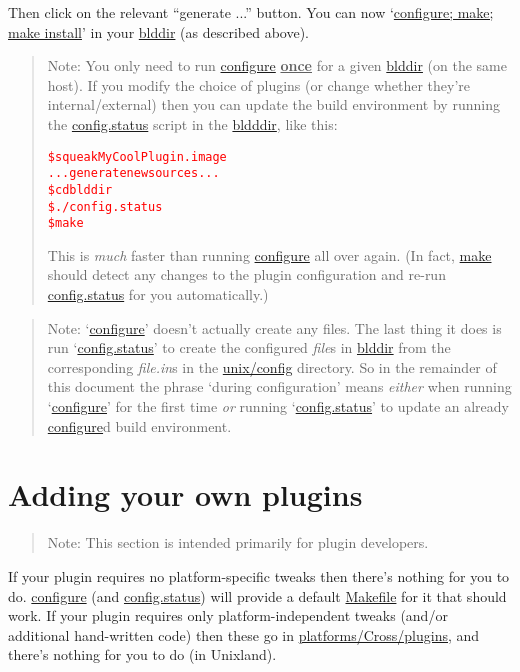 \documentclass{article}
\newcommand{\cmd}{\url}
\newcommand{\cmd}{\texttt}
\newenvironment{note}{\begin{quote}\color{red} Note: }{\end{quote}}
\begin{document}
Then click on the relevant ``\textsf{generate ...}'' button.  You can now
`\cmd{configure; make; make install}' in your \cmd{blddir} (as
described above).

\begin{note}
You only need to run
\cmd{configure}
\textbf{\underline{once}} for a given
\cmd{blddir} (on the same host).
If you modify the choice of plugins
(or change whether they're internal/external)
then you can update the build environment by running the
\cmd{config.status}
script in the \cmd{bldddir}, like this:
\textcolor{red}{\begin{alltt}
  \$ squeak MyCoolPlugin.image
  ... generate new sources ...
  \$ cd blddir
  \$ ./config.status
  \$ make
\end{alltt}}
This is \emph{much} faster than running \cmd{configure} all over again.
(In fact, \cmd{make} should detect any changes to the plugin configuration
and re-run \cmd{config.status} for you automatically.)
\end{note}

\begin{note}
`\cmd{configure}' doesn't actually create any files.  The last thing it
does is run `\cmd{config.status}' to create the configured \emph{file}s
in \cmd{blddir} from the corresponding \emph{file.in}s in the
\cmd{unix/config} directory.  So in the remainder of this document the
phrase `during configuration' means \emph{either} when running
`\cmd{configure}' for the first time \emph{or} running
`\cmd{config.status}' to update an already \cmd{configure}d build
environment.
\end{note}


\section{Adding your own plugins}

\begin{note}
This section is intended primarily for plugin developers.
\end{note}

If your plugin
 requires no platform-specific tweaks then there's
nothing for you to do.  \cmd{configure} (and \cmd{config.status})
will provide a default \cmd{Makefile} for it that should work.  If your
plugin requires only platform-independent tweaks (and/or additional
hand-written code) then these go in \cmd{platforms/Cross/plugins}, and
there's nothing for you to do (in Unixland).
\end{document}
